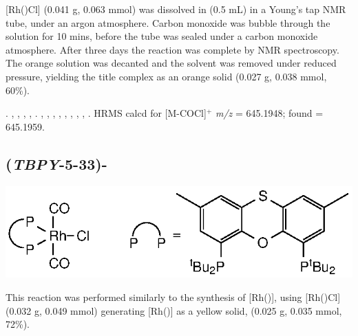 [Rh(\tBusixantphos)Cl] (0.041 g, 0.063 mmol) was dissolved in  (0.5 mL) in a Young's tap NMR tube, under an argon atmosphere.  Carbon monoxide was bubble through the solution for 10 mins, before the tube was sealed under a carbon monoxide atmosphere.  After three days the reaction was complete by \phosphorus{} NMR spectroscopy.  The orange solution was decanted and the solvent was removed under reduced pressure, yielding the title complex as an orange solid (0.027 g, 0.038 mmol, 60\%). 

.
,
,
,
,
.
,
,
,
,
,
,
,
,
.
HRMS calcd for  [M-COCl]$^+$ \emph{m/z} = 645.1948; found = 645.1959.



\subsection*{(\emph{TBPY}-5-33)-}

\begin{structure}[h]
\begin{center}
\includegraphics{../Structures/RhCl(StBu)(CO)2.eps}
\end{center}
\end{structure}

This reaction was performed similarly to the synthesis of [Rh(\tBusixantphos)], using [Rh(\tButhixantphos)Cl] (0.032 g, 0.049 mmol) generating [Rh(\tButhixantphos)] as a yellow solid, (0.025 g, 0.035 mmol, 72\%).  

